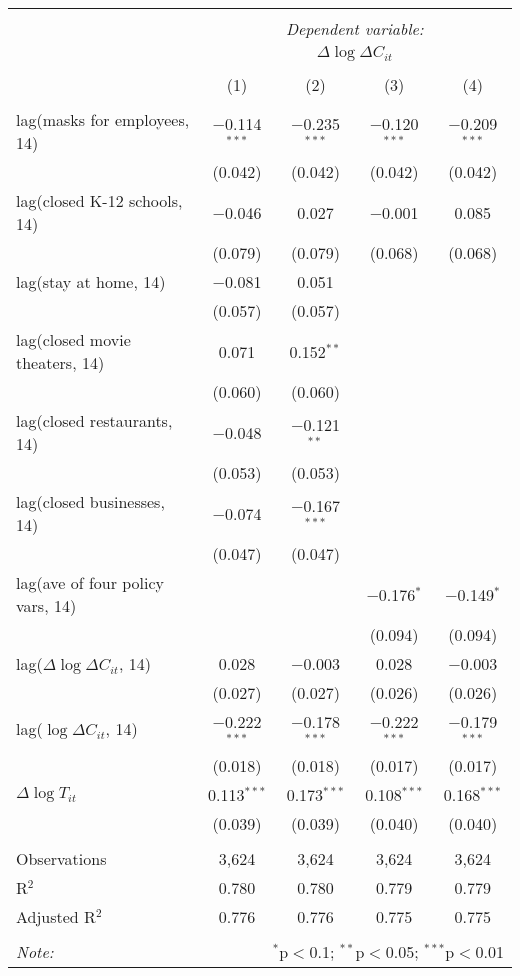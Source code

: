 \begin{tabular}{@{\extracolsep{1pt}}lcccc} 
\\[-1.8ex]\hline 
\hline \\[-1.8ex] 
 & \multicolumn{4}{c}{\textit{Dependent variable:}} \\ 
\cline{2-5} 
 & \multicolumn{4}{c}{$\Delta \log \Delta C_{it}$} \\ 
\\[-1.8ex] & (1) & (2) & (3) & (4)\\ 
\hline \\[-1.8ex] 
 lag(masks for employees, 14) & $-$0.114$^{***}$ & $-$0.235$^{***}$ & $-$0.120$^{***}$ & $-$0.209$^{***}$ \\ 
  & (0.042) & (0.042) & (0.042) & (0.042) \\ 
  lag(closed K-12 schools, 14) & $-$0.046 & 0.027 & $-$0.001 & 0.085 \\ 
  & (0.079) & (0.079) & (0.068) & (0.068) \\ 
  lag(stay at home, 14) & $-$0.081 & 0.051 &  &  \\ 
  & (0.057) & (0.057) &  &  \\ 
  lag(closed movie theaters, 14) & 0.071 & 0.152$^{**}$ &  &  \\ 
  & (0.060) & (0.060) &  &  \\ 
  lag(closed restaurants, 14) & $-$0.048 & $-$0.121$^{**}$ &  &  \\ 
  & (0.053) & (0.053) &  &  \\ 
  lag(closed businesses, 14) & $-$0.074 & $-$0.167$^{***}$ &  &  \\ 
  & (0.047) & (0.047) &  &  \\ 
  lag(ave of four policy vars, 14) &  &  & $-$0.176$^{*}$ & $-$0.149$^{*}$ \\ 
  &  &  & (0.094) & (0.094) \\ 
  lag($\Delta \log \Delta C_{it}$, 14) & 0.028 & $-$0.003 & 0.028 & $-$0.003 \\ 
  & (0.027) & (0.027) & (0.026) & (0.026) \\ 
  lag($\log \Delta C_{it}$, 14) & $-$0.222$^{***}$ & $-$0.178$^{***}$ & $-$0.222$^{***}$ & $-$0.179$^{***}$ \\ 
  & (0.018) & (0.018) & (0.017) & (0.017) \\ 
  $\Delta \log T_{it}$ & 0.113$^{***}$ & 0.173$^{***}$ & 0.108$^{***}$ & 0.168$^{***}$ \\ 
  & (0.039) & (0.039) & (0.040) & (0.040) \\ 
 \hline \\[-1.8ex] 
Observations & 3,624 & 3,624 & 3,624 & 3,624 \\ 
R$^{2}$ & 0.780 & 0.780 & 0.779 & 0.779 \\ 
Adjusted R$^{2}$ & 0.776 & 0.776 & 0.775 & 0.775 \\ 
\hline 
\hline \\[-1.8ex] 
\textit{Note:}  & \multicolumn{4}{r}{$^{*}$p$<$0.1; $^{**}$p$<$0.05; $^{***}$p$<$0.01} \\ 
\end{tabular} 